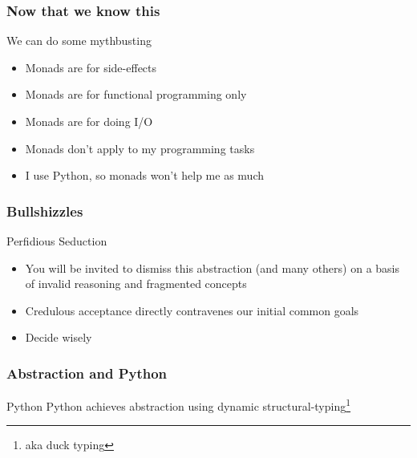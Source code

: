 \begin{frame}
\frametitle{Now that we know this}
\begin{block}{We can do some mythbusting}
\begin{itemize}
  \item<1-> Monads are for side-effects
  \item<2-> Monads are for functional programming only
  \item<3-> Monads are for doing I/O
  \item<4-> Monads don't apply to my programming tasks
  \item<5-> I use Python, so monads won't help me as much
\end{itemize}
\end{block}
\end{frame}


\begin{frame}
\frametitle{Bullshizzles}
\begin{block}{Perfidious Seduction}
\begin{itemize}
  \item<1-> You will be invited to dismiss this abstraction \tiny{(and many others)} \normalsize on a basis of invalid reasoning and fragmented concepts
  \item<2-> Credulous acceptance directly contravenes our initial common goals
  \item<2-> Decide wisely
\end{itemize}
\end{block}
\end{frame}


\begin{frame}
\frametitle{Abstraction and Python}
\begin{block}{Python}
Python achieves abstraction using dynamic structural-typing\footnote{aka duck typing}
\end{block}
\end{frame}


